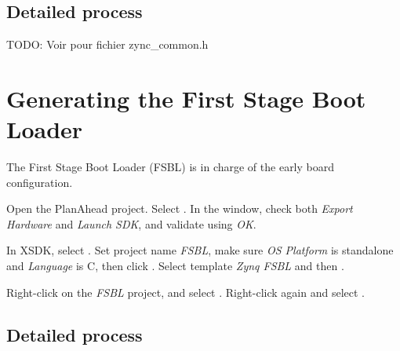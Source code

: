 \documentclass[openany,a4paper]{book}
\begin{document}
\subsection{Detailed process}

TODO: Voir pour fichier zync\_common.h


\section{Generating the First Stage Boot Loader}

The First Stage Boot Loader (FSBL) is in charge of the early board configuration.

Open the PlanAhead project.
Select .
In the window, check both \textit{Export Hardware} and \textit{Launch SDK}, and validate using \textit{OK}.

In XSDK, select .
Set project name \textit{FSBL}, make sure \textit{OS Platform} is standalone and \textit{Language} is C, then click .
Select template \textit{Zynq FSBL} and then .

Right-click on the \textit{FSBL} project, and select .
Right-click again and select .

\subsection{Detailed process}


\end{document}
